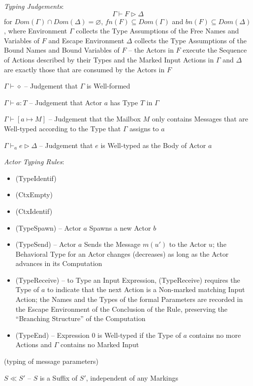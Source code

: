 \emph{Typing Judgements}:
\[
  \Gamma \vdash F \rhd \Delta
\]
for $Dom(\Gamma) \cap Dom(\Delta) = \varnothing$, $fn(F) \subseteq
Dom(\Gamma)$ and $bn(F) \subseteq Dom(\Delta)$, where Environment
$\Gamma$ collects the Type Assumptions of the Free Names and Variables
of $F$ and Escape Environment $\Delta$ collects the Type Assumptions
of the Bound Names and Bound Variables of $F$ -- the Actors in $F$
execute the Sequence of Actions described by their Types and the
Marked Input Actions in $\Gamma$ and $\Delta$ are exactly those that
are consumed by the Actors in $F$

$\Gamma \vdash \diamond$ -- Judgement that $\Gamma$ is Well-formed

$\Gamma \vdash a:T$ -- Judgement that Actor $a$ has Type $T$ in
$\Gamma$

$\Gamma \vdash [a \mapsto M]$ -- Judgement that the Mailbox $M$ only
contains Messages that are Well-typed according to the Type that
$\Gamma$ assigns to $a$

$\Gamma \vdash_a e \rhd \Delta$ -- Judgement that $e$ is Well-typed as
the Body of Actor $a$

\emph{Actor Typing Rules}:
\begin{itemize}
  \item (TypeIdentif)
  \item (CtxEmpty)
  \item (CtxIdentif)
  \item (TypeSpawn) -- Actor $a$ Spawns a new Actor $b$
  \item (TypeSend) -- Actor $a$ Sends the Message $m(u')$ to the Actor
    $u$; the Behavioral Type for an Actor changes (decreases) as long
    as the Actor advances in its Computation %
  \item (TypeReceive) -- to Type an Input Expression, (TypeReceive)
    requires the Type of $a$ to indicate that the next Action is a
    Non-marked matching Input Action; the Names and the Types of the
    formal Parameters are recorded in the Escape Environment of the
    Conclusion of the Rule, preserving the ``Branching Structure''
    of the Computation %
  \item (TypeEnd) -- Expression $0$ is Well-typed if the Type of $a$
    contains no more Actions and $\Gamma$ contains no Marked Input
\end{itemize}

(typing of message parameters) %

$S \ll S'$ -- $S$ is a Suffix of $S'$, independent of any Markings


